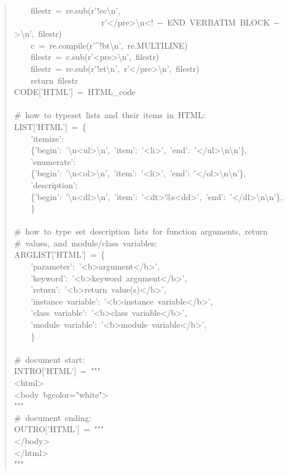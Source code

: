 \documentclass[a4paper,english]{article}
\begin{document}
\begin{quote}
{~~~~filestr~=~re.sub(r'!ec\textbackslash{}n',\\
~~~~~~~~~~~~~~~~~~~~~r'</pre>\textbackslash{}n<!~-{}-~END~VERBATIM~BLOCK~-{}->\textbackslash{}n',~filestr)\\
~~~~c~=~re.compile(r'\textasciicircum{}!bt\textbackslash{}n',~re.MULTILINE)\\
~~~~filestr~=~c.sub(r'<pre>\textbackslash{}n',~filestr)\\
~~~~filestr~=~re.sub(r'!et\textbackslash{}n',~r'</pre>\textbackslash{}n',~filestr)\\
~~~~return~filestr\\
CODE{[}'HTML'{]}~=~HTML\_code\\
~\\
\#~how~to~typeset~lists~and~their~items~in~HTML:\\
LIST{[}'HTML'{]}~=~\{\\
~~~~'itemize':\\
~~~~\{'begin':~'\textbackslash{}n<ul>\textbackslash{}n',~'item':~'<li>',~'end':~'</ul>\textbackslash{}n\textbackslash{}n'\},\\
~~~~'enumerate':\\
~~~~\{'begin':~'\textbackslash{}n<ol>\textbackslash{}n',~'item':~'<li>',~'end':~'</ol>\textbackslash{}n\textbackslash{}n'\},\\
~~~~'description':\\
~~~~\{'begin':~'\textbackslash{}n<dl>\textbackslash{}n',~'item':~'<dt>\%s<dd>',~'end':~'</dl>\textbackslash{}n\textbackslash{}n'\},\\
~~~~\}\\
~\\
\#~how~to~type~set~description~lists~for~function~arguments,~return\\
\#~values,~and~module/class~variables:\\
ARGLIST{[}'HTML'{]}~=~\{\\
~~~~'parameter':~'<b>argument</b>',\\
~~~~'keyword':~'<b>keyword~argument</b>',\\
~~~~'return':~'<b>return~value(s)</b>',\\
~~~~'instance~variable':~'<b>instance~variable</b>',\\
~~~~'class~variable':~'<b>class~variable</b>',\\
~~~~'module~variable':~'<b>module~variable</b>',\\
~~~~\}\\
~\\
\#~document~start:\\
INTRO{[}'HTML'{]}~=~"{}"{}"\\
<html>\\
<body~bgcolor="white">\\
"{}"{}"\\
\#~document~ending:\\
OUTRO{[}'HTML'{]}~=~"{}"{}"\\
</body>\\
</html>\\
"{}"{}"
}
\end{quote}
\end{document}
